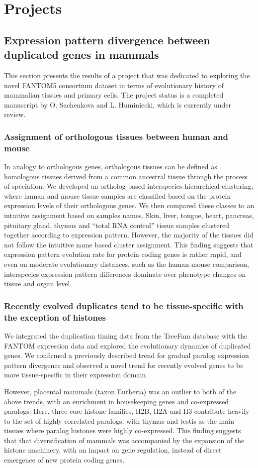 \documentclass[11pt, a4paper,oneside]{report}
\newcommand{\mychapter}[2]{
    \setcounter{chapter}{#1}
    \setcounter{section}{0}
    \chapter*{#2}
    \addcontentsline{toc}{chapter}{#2}
}
\begin{document}
\mychapter{3}{Projects}
\section{Expression pattern divergence between duplicated genes in mammals}
This section presents the results of a project that was dedicated to exploring the novel FANTOM5 consortium dataset in terms of evolutionary history of mammalian tissues and primary cells. The project status is a completed manuscript by O. Sachenkova and L. Huminiecki, which is currently under review. 
\subsection{Assignment of orthologous tissues between human and mouse}
In analogy to orthologous genes, orthologous tissues can be defined as homologous tissues derived from a common ancestral tissue through the process of speciation.  We developed an ortholog-based interspecies hierarchical clustering, where human and mouse tissue samples are classified based on the protein expression levels of their orthologous genes. We then compared these classes to an intuitive assignment based on samples names. Skin, liver, tongue, heart, pancreas, pituitary gland, thymus and “total RNA control” tissue samples clustered together according to expression pattern. However, the majority of the tissues did not follow the intuitive name based cluster assignment.  This finding suggests that expression pattern evolution rate for protein coding genes is rather rapid, and even on moderate evolutionary distances, such as the human-mouse comparison, interspecies expression pattern differences dominate over phenotype changes on tissue and organ level. 
\subsection{Recently evolved duplicates tend to be tissue-specific with the exception of histones}
We integrated the duplication timing data from the TreeFam database with the FANTOM expression data and explored the evolutionary dynamics of duplicated genes. We confirmed a previously described trend for gradual paralog expression pattern divergence and observed
a novel trend for recently evolved genes to be more tissue-specific in their expression domain.

However, placental mammals (taxon Eutheria) was an outlier to both of the above trends, with an enrichment in housekeeping genes and co-expressed paralogs. Here, three core histone families, H2B, H2A and H3 contribute heavily to the set of highly correlated paralogs, with thymus and testis as the main tissues where paralog histones were highly co-expressed. This finding suggests that that diversification of mammals was accompanied by the expansion of the  histone machinery, with an impact on gene regulation, instead of direct emergence of new protein coding genes. 
\end{document}
